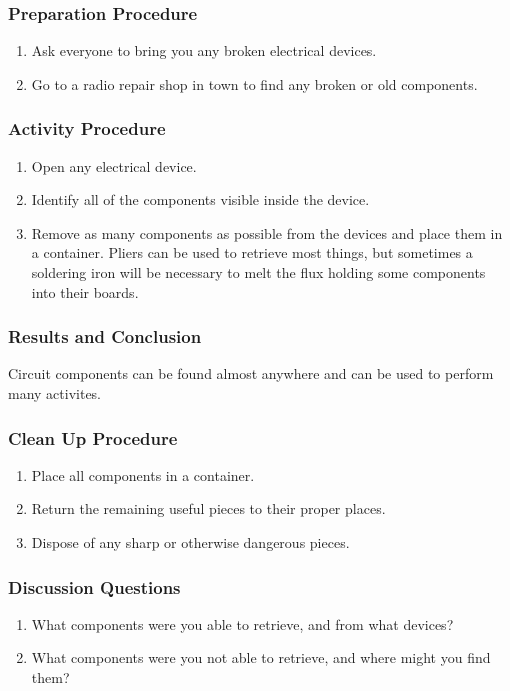 \subsubsection*{Preparation Procedure}
\begin{enumerate}
\item{Ask everyone to bring you any broken electrical devices.} 
\item{Go to a radio repair shop in town to find any broken or old components.} 
\end{enumerate}

\subsubsection*{Activity Procedure}
\begin{enumerate}
\item{Open any electrical device.} 
\item{Identify all of the components visible inside the device.} 
\item{Remove as many components as possible from the devices and place them in a container. Pliers can be used to retrieve most things, but sometimes a soldering iron will be necessary to melt the flux holding some components into their boards.} 
\end{enumerate}

\subsubsection*{Results and Conclusion}
Circuit components can be found almost anywhere and can be used to perform many activites.

\subsubsection*{Clean Up Procedure}
\begin{enumerate}
\item{Place all components in a container.} 
\item{Return the remaining useful pieces to their proper places.} 
\item{Dispose of any sharp or otherwise dangerous pieces.} 
\end{enumerate}

\subsubsection*{Discussion Questions}
\begin{enumerate}
\item{What components were you able to retrieve, and from what devices?}
\item{What components were you not able to retrieve, and where might you find them?}
\end{enumerate}


